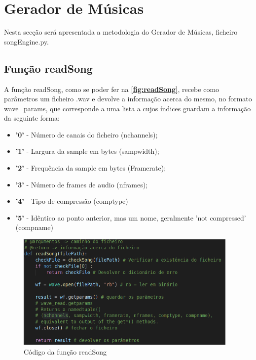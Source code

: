\documentclass{report}
\begin{document}
\section{Gerador de Músicas}
\label{sec:songEngine}
Nesta secção será apresentada a metodologia do Gerador de Músicas, ficheiro songEngine.py.

\subsection{Função readSong}
\label{ssec:readSong}
A função readSong, como se poder fer na \textbf{\autoref{fig:readSong}}, recebe como parâmetros um ficheiro .wav e devolve a informação acerca do mesmo,
no formato wave\_params, que corresponde a uma lista a cujos índices guardam a informação da seguinte forma:
\begin{itemize}
    \item \textbf{'0'} - Número de canais do ficheiro (nchannels);
    \item \textbf{'1'} - Largura da sample em bytes (sampwidth);
    \item \textbf{'2'} - Frequência da sample em bytes (Framerate);
    \item \textbf{'3'} - Número de frames de audio (nframes);
    \item \textbf{'4'} - Tipo de compressão (comptype)
    \item \textbf{'5'} - Idêntico ao ponto anterior, mas um nome, geralmente 'not compressed' (compname)
\end{itemize}

\begin{figure}[!h]
\center 
\includegraphics[height=160pt]{img/readSong.png}
\caption{Código da função readSong}
\label{fig:readSong}
\end{figure}
\end{document}
